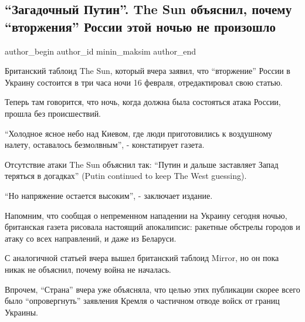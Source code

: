  
 
 
 
 
 
\subsection{\enquote{Загадочный Путин}. The Sun объяснил, почему \enquote{вторжения} России этой ночью не произошло}
\label{sec:16_02_2022.stz.news.ua.strana.1.zagadochnyj_putin}
 
\ifcmt
 author_begin
   author_id minin_maksim
 author_end
\fi

Британский таблоид The Sun, который вчера заявил, что \enquote{вторжение} России в
Украину состоится в три часа ночи 16 февраля, отредактировал свою статью.

Теперь там говорится, что ночь, когда должна была состояться атака России,
прошла без происшествий.


\enquote{Холодное ясное небо над Киевом, где люди приготовились к воздушному налету,
оставалось безмолвным}, - констатирует газета.

Отсутствие атаки The Sun объяснил так: \enquote{Путин и дальше заставляет Запад
теряться в догадках} (Putin continued to keep The West guessing).

\enquote{Но напряжение остается высоким}, - заключает издание.

Напомним, что сообщая о непременном нападении на Украину сегодня ночью,
британская газета рисовала настоящий апокалипсис: ракетные обстрелы городов и
атаку со всех направлений, и даже из Беларуси.

С аналогичной статьей вчера вышел британский таблоид Mirror, но он пока никак
не объяснил, почему война не началась. 

Впрочем, \enquote{Страна} вчера уже объясняла, что целью этих публикации скорее
всего было \enquote{опровергнуть} заявления Кремля о частичном отводе войск от
границ Украины. 

